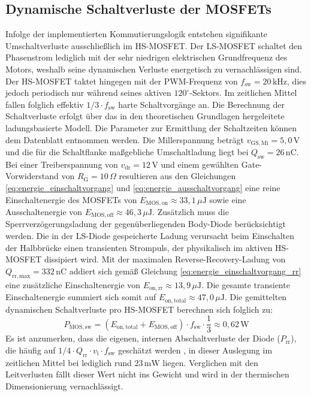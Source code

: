 \subsection{Dynamische Schaltverluste der MOSFETs}
\label{subsec:schaltverluste}

Infolge der implementierten Kommutierungslogik entstehen signifikante Umschaltverluste ausschließlich im HS-MOSFET. Der LS-MOSFET schaltet den Phasenstrom lediglich mit der sehr niedrigen elektrischen Grundfrequenz des Motors, weshalb seine dynamischen Verluste energetisch zu vernachlässigen sind. Der HS-MOSFET taktet hingegen mit der PWM-Frequenz von $f_{\mathrm{sw}} = 20\,\mathrm{kHz}$, dies jedoch periodisch nur während seines aktiven $120^\circ$-Sektors. Im zeitlichen Mittel fallen folglich effektiv $1/3 \cdot f_{\mathrm{sw}}$ harte Schaltvorgänge an.
Die Berechnung der Schaltverluste erfolgt über das in den theoretischen Grundlagen hergeleitete ladungsbasierte Modell. Die Parameter zur Ermittlung der Schaltzeiten können dem Datenblatt \cite{DS_IPP034N08N5} entnommen werden. Die Millerspannung beträgt $v_{\mathrm{GS,Mi}} = 5{,}0\,\mathrm{V}$ und die für die Schaltflanke maßgebliche Umschaltladung liegt bei $Q_{\mathrm{sw}} = 26\,\mathrm{nC}$. Bei einer Treiberspannung von $v_{\mathrm{dr}} = 12\,\mathrm{V}$ und einem gewählten Gate-Vorwiderstand von $R_{\mathrm{G}} = 10\,\Omega$ resultieren aus den Gleichungen \ref{eq:energie_einschaltvorgang} und \ref{eq:energie_ausschaltvorgang} eine reine Einschaltenergie des MOSFETs von $E_{\mathrm{MOS,on}} \approx 33{,}1\,\mu\mathrm{J}$ sowie eine Ausschaltenergie von $E_{\mathrm{MOS,off}} \approx 46{,}3\,\mu\mathrm{J}$.
Zusätzlich muss die Sperrverzögerungsladung der gegenüberliegenden Body-Diode berücksichtigt werden. Die in der LS-Diode gespeicherte Ladung verursacht beim Einschalten der Halbbrücke einen transienten Strompuls, der physikalisch im aktiven HS-MOSFET dissipiert wird. Mit der maximalen Reverse-Recovery-Ladung von $Q_{\mathrm{rr,max}} = 332\,\mathrm{nC}$ addiert sich gemäß Gleichung \ref{eq:energie_einschaltvorgang_rr} eine zusätzliche Einschaltenergie von $E_{\mathrm{on,rr}} \approx 13{,}9\,\mu\mathrm{J}$. 
Die gesamte transiente Einschaltenergie summiert sich somit auf $E_{\mathrm{on,total}} \approx 47{,}0\,\mu\mathrm{J}$. Die gemittelten dynamischen Schaltverluste pro HS-MOSFET berechnen sich folglich zu:
\begin{equation}
    P_{\mathrm{MOS,sw}} = (E_{\mathrm{on,total}} + E_{\mathrm{MOS,off}}) \cdot f_{\mathrm{sw}} \cdot \frac{1}{3} \approx 0{,}62\,\mathrm{W}
\end{equation}
Es ist anzumerken, dass die eigenen, internen Abschaltverluste der Diode ($P_{\mathrm{rr}}$), die häufig auf $1/4 \cdot Q_{\mathrm{rr}} \cdot v_{\mathrm{i}} \cdot f_{\mathrm{sw}}$ geschätzt werden \cite[S.~10]{Infineon_MOSFET_Losses}, in dieser Auslegung im zeitlichen Mittel bei lediglich rund $23\,\mathrm{mW}$ liegen. Verglichen mit den Leitverlusten fällt dieser Wert nicht ins Gewicht und wird in der thermischen Dimensionierung vernachlässigt.

